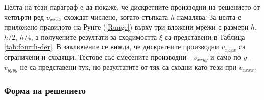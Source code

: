 \documentclass[a4paper]{article}
\newcommand{\rf}[1]{(\ref{#1})}
\theoremstyle{remark}
\begin{document}
\FloatBarrier
Целта на този параграф е да покаже, че дискретните производни на решението от четвърти ред $v_{\widehat{xxxx}}$ схождат числено, когато стъпката $h$ намалява. За целта е приложено правилото на Рунге \rf{Runge} върху три вложени мрежи с размери $h$, $h/2$, $h/4$, а получените резултати за сходимостта $\xi$ са представени в Таблица \ref{tab:fourth-der}. В заключение се вижда, че дискретните производни $v_{\widehat{xxxx}}$ са ограничени и сходящи. Тестове със смесените производни - $v_{xxyy}$ и само по $y$ - $v_{yyyy}$ не са представени тук, но резултатите от тях са сходни като тези при $v_{xxxx}$.

\subsubsection{Форма на решението}
\end{document}
